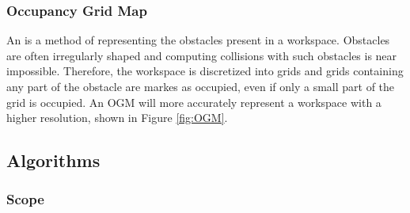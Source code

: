     

    \subsubsection{Occupancy Grid Map}
    An  is a method of representing the obstacles present in a \gls{workspace}. Obstacles are often irregularly shaped and computing collisions with such obstacles is near impossible. Therefore, the \gls{workspace} is discretized into grids and grids containing any part of the obstacle are markes as occupied, even if only a small part of the grid is occupied. An \gls{OGM} will more accurately represent a \gls{workspace} with a higher resolution, shown in Figure \ref{fig:OGM}.

    

\subsection{Algorithms}
    
    \subsubsection{Scope}

